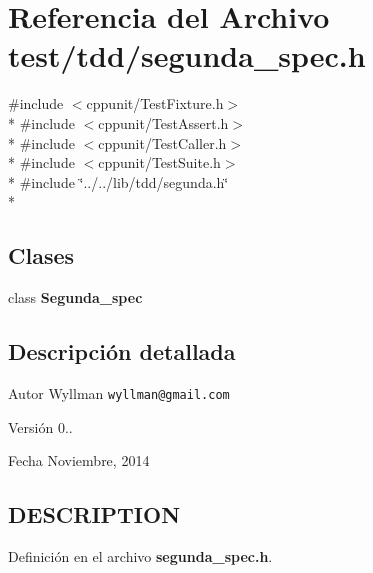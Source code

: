 \section{Referencia del Archivo test/tdd/segunda\+\_\+spec.h}
\label{segunda__spec_8h}
{\ttfamily \#include $<$cppunit/\+Test\+Fixture.\+h$>$}\\*
{\ttfamily \#include $<$cppunit/\+Test\+Assert.\+h$>$}\\*
{\ttfamily \#include $<$cppunit/\+Test\+Caller.\+h$>$}\\*
{\ttfamily \#include $<$cppunit/\+Test\+Suite.\+h$>$}\\*
{\ttfamily \#include \char`\"{}../../lib/tdd/segunda.\+h\char`\"{}}\\*
\subsection*{Clases}
\begin{DoxyCompactItemize}
\item 
class {\bf Segunda\+\_\+spec}
\end{DoxyCompactItemize}


\subsection{Descripción detallada}
\begin{DoxyAuthor}{Autor}
Wyllman {\tt wyllman@gmail.\+com} 
\end{DoxyAuthor}
\begin{DoxyVersion}{Versión}
0.. 
\end{DoxyVersion}
\begin{DoxyDate}{Fecha}
Noviembre, 2014 
\end{DoxyDate}
\subsection{D\+E\+S\+C\+R\+I\+P\+T\+I\+O\+N}\label{main_8cpp_DESCRIPTION}


Definición en el archivo {\bf segunda\+\_\+spec.\+h}.

